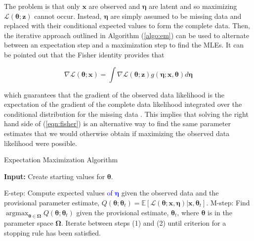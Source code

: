 \documentclass[12pt]{article}
\DeclareMathOperator*{\argmax}{argmax}
\begin{document}
The problem is that only $\bm{x}$ are observed and $\bm{\eta}$ are latent and so maximizing $\mathcal{L}(\bm{\theta};\bm{z})$ cannot occur. Instead, $\bm{\eta}$ are simply assumed to be missing data and replaced with their conditional expected values to form the complete data. Then, the iterative approach outlined in Algorithm (\ref{algo:em}) can be used to alternate between an expectation step and a maximization step to find the MLEs. It can be pointed out that the Fisher identity \cite{fisher_1925} provides that 

\begin{equation}
\label{eqn:fisher}
\nabla\mathcal{L}(\bm{\theta};\bm{x}) = \int \nabla\mathcal{L}(\bm{\theta};\bm{z})g(\bm{\eta};\bm{x},\bm{\theta})d\bm{\eta}
\end{equation} 

\noindent which guarantees that the gradient of the observed data likelihood is the expectation of the gradient of the complete data likelihood integrated over the conditional distribution for the missing data \cite{cai:fisher}. This implies that solving the right hand side of (\ref{eqn:fisher}) is an alternative way to find the same parameter estimates that we would otherwise obtain if maximizing the observed data likelihood were possible.  

\begin{algorithm}
\caption{Expectation Maximization Algorithm}
\label{algo:em}
	\hspace*{\algorithmicindent} \textbf{Input:} Create starting values for $\bm{\theta}$.
\begin{algorithmic}[1]
	\State E-step: Compute expected values \textcolor{blue}{of $\bm{\eta}$} given the observed data and the provisional parameter estimate, $Q(\bm{\theta};\bm{\theta}_t) = \mathbb{E}[\mathcal{L}(\bm{\theta};\bm{x},\bm{\eta})|\bm{x},\bm{\theta}_t]$.
	\State M-step: Find $\argmax_{\bm{\theta} \in \bm{\Omega}} Q(\bm{\theta};\bm{\theta}_t)$ given the provisional estimate, $\bm{\theta}_t$, where $\bm{\theta}$ is in the parameter space $\bm{\Omega}$.
	\State Iterate between steps (1) and (2) until criterion for a stopping rule has been satisfied. 
\end{algorithmic}
\end{algorithm}
\end{document}
